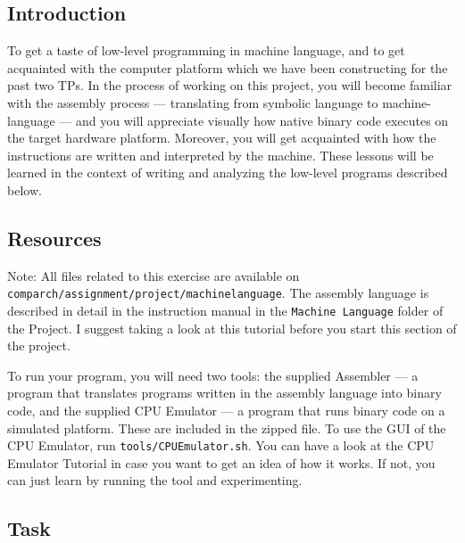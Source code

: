 \documentclass[11pt]{article}
\begin{document}
\subsection{Introduction}

To get a taste of low-level programming in machine language, and to get acquainted with the
 computer platform which we have been constructing for the past two TPs. In the process of working on this project, you will become familiar with
the assembly process — translating from symbolic language to machine-language — and you will
appreciate visually how native binary code executes on the target hardware platform. Moreover, you will get acquainted with how the instructions are written and interpreted by the machine. These lessons
will be learned in the context of writing and analyzing the low-level programs described below.

\subsection{Resources}
Note: All files related to this exercise are available on \texttt{comparch/assignment/project/machinelanguage}.
The assembly language is described in detail in the instruction manual in the \texttt{Machine Language} folder of the Project. I suggest taking a look at this tutorial before you start this section of the project.

To run your program, you will need two tools: the supplied Assembler — a program that translates programs written in the assembly language
into binary code, and the supplied CPU Emulator — a program that runs binary code on a simulated platform. These are included in the zipped file. To use the GUI of the CPU Emulator, run \texttt{tools/CPUEmulator.sh}. You can have a look at the CPU Emulator Tutorial in case you want to get an idea of how it works. If not, you can just learn by running the tool and experimenting.

\subsection{Task}
\end{document}
